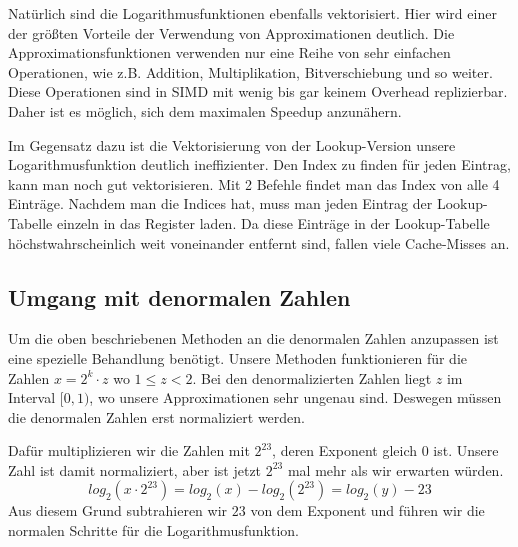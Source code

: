 Natürlich sind die Logarithmusfunktionen ebenfalls vektorisiert. Hier wird einer der größten Vorteile der Verwendung von Approximationen deutlich. Die Approximationsfunktionen verwenden nur eine Reihe von sehr einfachen Operationen, wie z.B. Addition, Multiplikation, Bitverschiebung und so weiter. Diese Operationen sind in SIMD mit wenig bis gar keinem Overhead replizierbar. Daher ist es möglich, sich dem maximalen Speedup anzunähern.

Im Gegensatz dazu ist die Vektorisierung von der Lookup-Version unsere Logarithmusfunktion deutlich ineffizienter. Den Index zu finden für jeden Eintrag, kann man noch gut vektorisieren. Mit 2 Befehle findet man das Index von alle 4 Einträge. Nachdem man die Indices hat, muss man jeden Eintrag der Lookup-Tabelle einzeln in das Register laden. Da diese Einträge in der Lookup-Tabelle höchstwahrscheinlich weit voneinander entfernt sind, fallen viele Cache-Misses an. 

\subsection{Umgang mit denormalen Zahlen}
Um die oben beschriebenen Methoden an die denormalen Zahlen anzupassen ist eine spezielle Behandlung benötigt. Unsere Methoden funktionieren für die Zahlen $x = 2^k \cdot z$ wo $1 \leq z < 2$. Bei den denormalizierten Zahlen liegt $z$ im Interval $[0,1)$, wo unsere Approximationen sehr ungenau sind. Deswegen müssen die denormalen Zahlen erst normaliziert werden. 

Dafür multiplizieren wir die Zahlen mit $2^{23}$, deren Exponent gleich $0$ ist. Unsere Zahl ist damit normaliziert, aber ist jetzt $2^{23}$ mal mehr als wir erwarten würden. \[log_2(x\cdot 2^{23}) = log_2(x) - log_2(2^{23}) = log_2(y) - 23\]
Aus diesem Grund subtrahieren wir $23$ von dem Exponent und führen wir die normalen Schritte für die Logarithmusfunktion.



